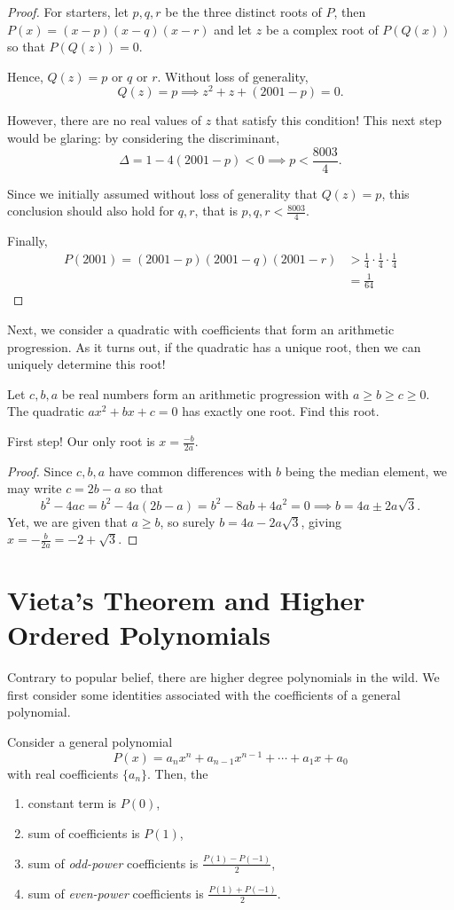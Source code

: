 \documentclass[../jarvis.tex]{subfiles}
\begin{document}
\begin{proof}
    For starters, let $p,q,r$ be the three distinct roots of $P$, then $P(x)=(x-p)(x-q)(x-r)$ and let $z$ be a complex root of $P(Q(x))$ so that $P(Q(z))=0$. 

Hence, $Q(z)=\text{$p$ or $q$ or $r$}$. Without loss of generality, $$Q(z)=p \implies z^2+z+(2001-p)=0.$$

However, there are no real values of $z$ that satisfy this condition! This next step would be glaring: by considering the discriminant,
$$\Delta=1-4(2001-p) < 0 \implies p < \frac{8003}{4}.$$

Since we initially assumed without loss of generality that $Q(z)=p$, this conclusion should also hold for $q, r$, that is $p,q,r < \frac{8003}{4}$.

Finally, \begin{align*}
    P(2001)=(2001-p)(2001-q)(2001-r) &> \frac{1}{4}\cdot\frac{1}{4}\cdot\frac{1}{4} \\
    &=\frac{1}{64}
\end{align*}
\end{proof}
Next, we consider a quadratic with coefficients that form an arithmetic progression. As it turns out, if the quadratic has a unique root, then we can uniquely determine this root!
\begin{example}[2013 AMC 10B P19]
    Let $c,b,a$ be real numbers form an arithmetic progression with $a\geq b\geq c\geq 0$. The quadratic $ax^2+bx+c=0$ has exactly one root. Find this root.
\end{example}
First step! Our only root is $x=\frac{-b}{2a}$.

\begin{proof}
    Since $c,b,a$ have common differences with $b$ being the median element, we may write $c=2b-a$ so that 
$$b^2-4ac=b^2-4a(2b-a)=b^2-8ab+4a^2=0 \implies b=4a\pm2a\sqrt{3}.$$
Yet, we are given that $a\geq b$, so surely $b=4a-2a\sqrt{3}$, giving $x=-\frac{b}{2a}=\boxed{-2+\sqrt{3}}.$
\end{proof}

\section{Vieta's Theorem and Higher Ordered Polynomials \med}
Contrary to popular belief, there are higher degree polynomials in the wild. We first consider some identities associated with the coefficients of a general polynomial.

Consider a general polynomial $$P(x)=a_nx^n+a_{n-1}x^{n-1}+\cdots+a_1x+a_0$$ with real coefficients $\{a_n\}$. Then, the
\begin{enumerate}
    \item constant term is $P(0)$,
    \item sum of coefficients is $P(1)$,
    \item sum of \textit{odd-power} coefficients is $\frac{P(1)-P(-1)}{2}$,
    \item sum of \textit{even-power} coefficients is $\frac{P(1)+P(-1)}{2}$.
\end{enumerate}
\end{document}
